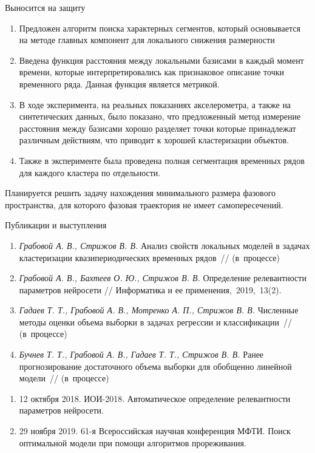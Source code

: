 \documentclass[10pt,pdf,hyperref={unicode}]{beamer}
\begin{document}
\begin{frame}[shrink=0]{Выносится на защиту}
\justifying

	\begin{enumerate}
	\justifying
		\item Предложен алгоритм поиска характерных сегментов, который основывается на методе главных компонент для локального снижения размерности
		\item Введена функция расстояния между локальными базисами в каждый момент времени, которые интерпретировались как признаковое описание точки временного ряда. Данная функция является метрикой.
		\item В ходе эксперимента, на реальных показаниях акселерометра, а также на синтетических данных, было показано, что предложенный метод измерение расстояния между базисами хорошо разделяет точки которые принадлежат различным действиям, что приводит к хорошей кластеризации объектов.
		\item Также в эксперименте была проведена полная сегментация временных рядов для каждого кластера по отдельности.
	\end{enumerate}
	
	Планируется решить задачу нахождения минимального размера фазового пространства, для которого  фазовая траектория не имеет самопересечений.
\end{frame}
\begin{frame}{Публикации и выступления}
\justifying
	\begin{enumerate}
	\justifying
		\item \textit{Грабовой А. В., Стрижов В. В.} Анализ свойств локальных моделей в задачах кластеризации квазипериодических временных рядов~// (в~процессе)
		\item \textit{Грабовой А. В., Бахтеев О. Ю., Стрижов В. В.} Определение релевантности параметров нейросети // Информатика и ее применения,~2019,~13(2).
		\item \textit{Гадаев Т. Т., Грабовой А. В., Мотренко А. П., Стрижов В. В.} Численные методы оценки объема выборки в задачах регрессии и классификации~// (в~процессе)
		\item \textit{Бучнев Т. Т., Грабовой А. В., Гадаев Т. Т., Стрижов В. В.} Ранее прогнозирование достаточного объема выборки для обобщенно линейной модели~// (в~процессе)
	\end{enumerate}
	
	\begin{enumerate}
	\justifying
		\item 12 октября 2018. ИОИ-2018. Автоматическое определение релевантности параметров нейросети.
		\item 29 ноября 2019. 61-я Всероссийская научная конференция МФТИ. Поиск оптимальной модели при помощи алгоритмов прореживания.
	\end{enumerate}
	
	
\end{frame}
\end{document}
